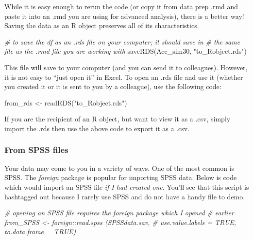 \documentclass[
  11pt,
]{book}
\newenvironment{Shaded}{\begin{snugshade}}{\end{snugshade}}
\newcommand{\CommentTok}[1]{\textcolor[rgb]{0.56,0.35,0.01}{\textit{#1}}}
\newcommand{\FunctionTok}[1]{\textcolor[rgb]{0.00,0.00,0.00}{#1}}
\newcommand{\NormalTok}[1]{#1}
\newcommand{\OtherTok}[1]{\textcolor[rgb]{0.56,0.35,0.01}{#1}}
\newcommand{\StringTok}[1]{\textcolor[rgb]{0.31,0.60,0.02}{#1}}
\begin{document}
While it is easy enough to rerun the code (or copy it from data prep .rmd and paste it into an .rmd you are using for advanced analysis), there is a better way! Saving the data as an R object preserves all of its characteristics.

\begin{Shaded}
\begin{Highlighting}[]
\CommentTok{\# to save the df as an .rds file on your computer; it should save in}
\CommentTok{\# the same file as the .rmd file you are working with}
\FunctionTok{saveRDS}\NormalTok{(Acc\_sim30, }\StringTok{"to\_Robject.rds"}\NormalTok{)}
\end{Highlighting}
\end{Shaded}

This file will save to your computer (and you can send it to colleagues). However, it is not easy to ``just open it'' in Excel. To open an .rds file and use it (whether you created it or it is sent to you by a colleague), use the following code:

\begin{Shaded}
\begin{Highlighting}[]
\NormalTok{from\_rds }\OtherTok{\textless{}{-}} \FunctionTok{readRDS}\NormalTok{(}\StringTok{"to\_Robject.rds"}\NormalTok{)}
\end{Highlighting}
\end{Shaded}

If you are the recipient of an R object, but want to view it as a .csv, simply import the .rds then use the above code to export it as a .csv.

\hypertarget{from-spss-files}{%
\subsubsection{From SPSS files}\label{from-spss-files}}

Your data may come to you in a variety of ways. One of the most common is SPSS. The \emph{foreign} package is popular for importing SPSS data. Below is code which would import an SPSS file \emph{if I had created one}. You'll see that this script is hashtagged out because I rarely use SPSS and do not have a handy file to demo.

\begin{Shaded}
\begin{Highlighting}[]
\CommentTok{\# opening an SPSS file requires the foreign package which I opened}
\CommentTok{\# earlier from\_SPSS \textless{}{-} foreign::read.spss (\textquotesingle{}SPSSdata.sav\textquotesingle{},}
\CommentTok{\# use.value.labels = TRUE, to.data.frame = TRUE)}
\end{Highlighting}
\end{Shaded}
\end{document}

